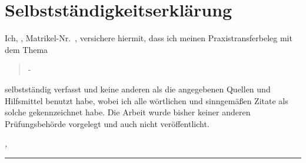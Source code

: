 %
\chapter*{Selbstständigkeitserklärung}
\label{sec:Selbstständigkeitserklärung}
\thispagestyle{empty}

Ich, \thesisName, Matrikel-Nr.\ \thesisMatrikel, versichere hiermit, dass ich meinen Praxistransferbeleg mit dem Thema
\begin{quote}
\textit{\thesisTitle} - \textit{\thesisSubtitle}
\end{quote}
selbstst\"{a}ndig verfasst und keine anderen als die angegebenen Quellen und Hilfsmittel benutzt habe, wobei ich alle w\"{o}rtlichen und sinngemäßen Zitate als solche gekennzeichnet habe. Die Arbeit wurde bisher keiner anderen Pr\"{u}fungsbeh\"{o}rde vorgelegt und auch nicht ver\"{o}ffentlicht.

\bigskip

\noindent\textit{\thesisUniversityCity, \thesisDate}

\smallskip

\begin{flushright}
	\begin{minipage}{5cm}
		\rule{\textwidth}{1pt}
		\centering\thesisName
	\end{minipage}
\end{flushright}

